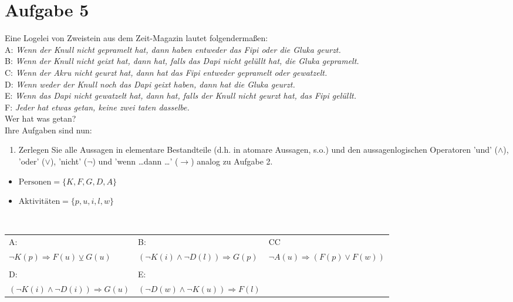 \section*{Aufgabe 5}

Eine Logelei von Zweistein aus dem Zeit-Magazin lautet folgendermaßen:\\

A: \textit{Wenn der Knull nicht gepramelt hat, dann haben entweder das Fipi oder die Gluka geurzt.}\\

B: \textit{Wenn der Knull nicht geixt hat, dann hat, falls das Dapi nicht gelüllt hat, die Gluka gepramelt.}\\

C: \textit{Wenn der Akru nicht geurzt hat, dann hat das Fipi entweder gepramelt oder gewatzelt.}\\

D: \textit{Wenn weder der Knull noch das Dapi geixt haben, dann hat die Gluka geurzt.}\\

E: \textit{Wenn das Dapi nicht gewatzelt hat, dann hat, falls der Knull nicht geurzt hat, das Fipi gelüllt.}\\

F: \textit{Jeder hat etwas getan, keine zwei taten dasselbe.}\\

Wer hat was getan?\\

Ihre Aufgaben sind nun:

\begin{enumerate}[label={a)}, leftmargin=*]
    \item Zerlegen Sie alle Aussagen in elementare Bestandteile (d.h. in atomare Aussagen, s.o.) und den aussagenlogischen Operatoren 'und' ($\land$), 'oder' ($\lor$), 'nicht' ($\neg$) und 'wenn \dots dann \dots ' ($\rightarrow$) analog zu Aufgabe 2.
\end{enumerate}

\begin{itemize}[leftmargin=*]
\item $\text{Personen} = \{ K, F, G, D, A\}$
\item $\text{Aktivitäten} = \{p, u, i, l , w\}$
\end{itemize}\

\begin{tabularx}{\textwidth}{XXX}
A: & B: & CC\\
$\neg K(p) \Rightarrow F(u) \veebar G(u)$ & $(\neg K(i) \land \neg D(l)) \Rightarrow G(p)$ & $\lnot A(u) \Rightarrow (F(p) \lor F(w))$\\
& &\\
D: & E: &\\
$(\neg K(i) \land \neg D(i)) \Rightarrow G(u)$ & $(\neg D(w) \land \neg K(u)) \Rightarrow F(l)$ &
\end{tabularx}

